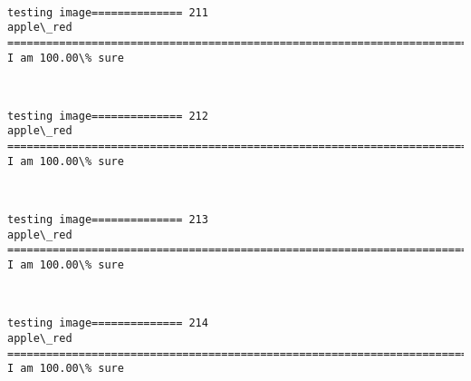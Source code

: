 \documentclass[11pt]{article}
\begin{document}
    \begin{center}
    \end{center}
    { \hspace*{\fill} \\}
    
    \begin{Verbatim}[commandchars=\\\{\}]
testing image============== 211
apple\_red
============================================================================
I am 100.00\% sure

    \end{Verbatim}

    \begin{center}
    \end{center}
    { \hspace*{\fill} \\}
    
    \begin{Verbatim}[commandchars=\\\{\}]
testing image============== 212
apple\_red
============================================================================
I am 100.00\% sure

    \end{Verbatim}

    \begin{center}
    \end{center}
    { \hspace*{\fill} \\}
    
    \begin{Verbatim}[commandchars=\\\{\}]
testing image============== 213
apple\_red
============================================================================
I am 100.00\% sure

    \end{Verbatim}

    \begin{center}
    \end{center}
    { \hspace*{\fill} \\}
    
    \begin{Verbatim}[commandchars=\\\{\}]
testing image============== 214
apple\_red
============================================================================
I am 100.00\% sure

    \end{Verbatim}
\end{document}
